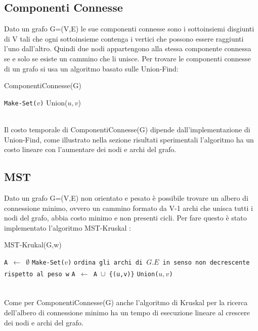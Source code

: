 \documentclass{article}
\begin{document}
\subsection{Componenti Connesse}
Dato un grafo G=(V,E) le sue componenti connesse sono i sottoinsiemi disgiunti di V tali che ogni sottoinsieme contenga i vertici che possono essere raggiunti l'uno dall'altro. Quindi due nodi appartengono alla stessa componente connessa se e solo se esiste un cammino che li unisce. Per trovare le componenti connesse di un grafo si usa un algoritmo basato sulle Union-Find: 
\begin{algorithm}
\caption{ComponentiConnesse(G)}\label{alg:cap}
\begin{algorithmic}
    \State \texttt{Make-Set($v$)}
\EndFor
{}
        \State Union($u,v$)
    \EndIf
\EndFor
\end{algorithmic}
\end{algorithm}
\\
Il costo temporale di ComponentiConnesse(G) dipende dall'implementazione di Union-Find, come illustrato nella sezione risultati sperimentali l'algoritmo ha un costo lineare con l'aumentare dei nodi e archi del grafo.

\pagebreak[4]

\subsection{MST}
Dato un grafo G=(V,E) non orientato e pesato è possibile trovare un albero di connessione minimo, ovvero un cammino formato da V-1 archi che unisca tutti i nodi del grafo, abbia costo minimo e non presenti cicli. Per fare questo è stato implementato l'algoritmo MST-Kruskal :
\begin{algorithm}
\caption{MST-Krukal(G,w)}\label{alg:cap2}
\begin{algorithmic}
\State \texttt{A $\xleftarrow[]{}$ $\emptyset$}
    \State \texttt{Make-Set($v$)}
\EndFor
\State \texttt{ordina gli archi di $G.E$ in senso non decrescente rispetto al peso w}
        \State \texttt{A $\xleftarrow[]{}$ A $\cup$ \{(u,v)\}}
        \State \texttt{Union($u,v$)}
    \EndIf
\EndFor
\end{algorithmic}
\end{algorithm}
\\
Come per ComponentiConnesse(G) anche l'algoritmo di Kruskal per la ricerca dell'albero di connessione minimo ha un tempo di esecuzione lineare al crescere dei nodi e archi del grafo.
\end{document}
